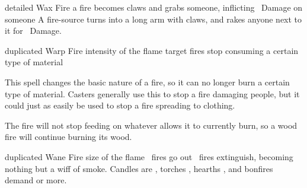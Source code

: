   {detailed}%
  {Wax}%
  {Fire}%
  {}%
  {a fire becomes claws and grabs someone, inflicting \rollConv\ Damage on someone}%
  {
    A fire-source turns into a long arm with claws, and rakes anyone next to it for \rollConv~Damage.
  }

  {duplicated}%
  {Warp}%
  {Fire}%
  {intensity of the flame}%
  {target fires stop consuming a certain type of material}%
  {
    This spell changes the basic nature of a fire, so it can no longer burn a certain type of material.
    Casters generally use this to stop a fire damaging people, but it could just as easily be used to stop a fire spreading to clothing.

    The fire will not stop feeding on whatever allows it to currently burn, so a wood fire will continue burning its wood.
  }

  {duplicated}%
  {Wane}%
  {Fire}%
  {size of the flame}%
  {\spellArea\ fires go out}%
  {
    \spellArea\ fires extinguish, becoming nothing but a wiff of smoke.
    Candles are \tn[6], torches \tn[7], hearths \tn[8], and bonfires demand \tn[9] or more.
  }
